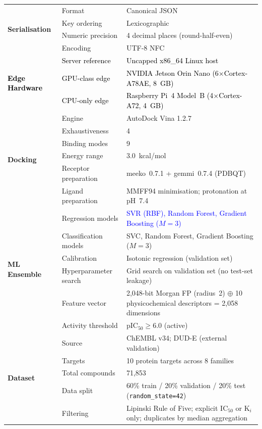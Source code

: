 \documentclass[conference]{IEEEtran}
\newcommand{\rev}[2]{\textcolor{blue}{#2}}
\begin{document}
\begin{table}[!htbp]
{\begin{tabular}{p{2.6cm} p{2.8cm} p{4.5cm}}
\midrule
\multirow{4}{*}{\textbf{Serialisation}}
  & Format                & Canonical JSON \\
  & Key ordering          & Lexicographic \\
  & Numeric precision     & 4 decimal places (round-half-even) \\
  & Encoding              & UTF-8 NFC \\

\midrule
\multirow{3}{*}{\textcolor{black}{\textbf{Edge Hardware}}}
  & \textcolor{black}{Server reference} & \textcolor{black}{Uncapped x86\_64 Linux host} \\
  & \textcolor{black}{GPU-class edge}   & \textcolor{black}{NVIDIA Jetson Orin Nano (6$\times$Cortex-A78AE, 8~GB)} \\
  & \textcolor{black}{CPU-only edge}    & \textcolor{black}{Raspberry Pi~4 Model~B (4$\times$Cortex-A72, 4~GB)} \\

\midrule
\multirow{6}{*}{\textbf{Docking}}
  & Engine                & AutoDock Vina 1.2.7 \\
  & Exhaustiveness        & 4 \\
  & Binding modes         & 9 \\
  & Energy range          & 3.0~kcal/mol \\
  & Receptor preparation  & meeko~0.7.1 + gemmi~0.7.4 (PDBQT) \\
  & Ligand preparation    & MMFF94 minimisation; protonation at pH~7.4 \\

\midrule
\multirow{6}{*}{\textbf{ML Ensemble}}
  & Regression models     & \rev{R2.1}{SVR (RBF), Random Forest, Gradient Boosting ($M{=}3$)} \\
  & Classification models & SVC, Random Forest, Gradient Boosting ($M{=}3$) \\
  & Calibration           & Isotonic regression (validation set) \\
  & Hyperparameter search & Grid search on validation set (no test-set leakage) \\
  & Feature vector        & 2{,}048-bit Morgan FP (radius~2) $\oplus$ 10 physicochemical
                           descriptors = 2{,}058 dimensions \\
  & Activity threshold    & pIC$_{50} \geq 6.0$ (active) \\

\midrule
\multirow{5}{*}{\textbf{Dataset}}
  & Source                & ChEMBL v34; DUD-E (external validation) \\
  & Targets               & 10 protein targets across 8 families \\
  & Total compounds       & 71{,}853 \\
  & Data split            & 60\% train / 20\% validation / 20\% test
                           (\texttt{random\_state=42}) \\
  & Filtering             & Lipinski Rule of Five; explicit IC$_{50}$ or
                           K$_i$ only; duplicates by median aggregation \\


\end{tabular}}
\end{table}
\end{document}
